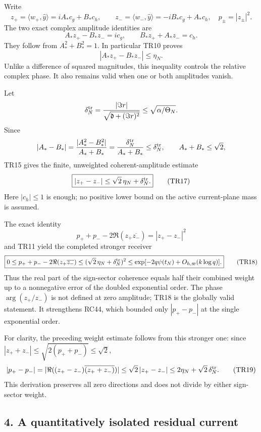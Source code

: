 \documentclass[10pt]{article}
\begin{document}
Write \[
z_+=\langle w_+,\widehat y\rangle=iA_*c_g+B_*c_h,\qquad
z_-=\langle w_-,\widehat y\rangle=-iB_*c_g+A_*c_h,
\quad p_\pm=|z_\pm|^2.
\tag{TR15}
\] The two exact complex amplitude identities are \[
\boxed{A_*z_+-B_*z_-=ic_g,\qquad
B_*z_++A_*z_-=c_h.}
\tag{TR16}
\] They follow from \(A_*^2+B_*^2=1\). In particular TR10 proves \[
|A_*z_+-B_*z_-|\le\eta_N.
\] Unlike a difference of squared magnitudes, this inequality controls the relative complex phase. It also remains valid when one or both amplitudes vanish.

Let \[
\delta_N^{\rm tr}=\frac{|\Im r|}{\sqrt{\mathfrak d+(\Im r)^2}}
\le\sqrt{\alpha/\Theta_N}.
\] Since \[
|A_*-B_*|=\frac{|A_*^2-B_*^2|}{A_*+B_*}
=\frac{\delta_N^{\rm tr}}{A_*+B_*}
\le\delta_N^{\rm tr},\qquad A_*+B_*\le\sqrt2,
\] TR15 gives the finite, unweighted coherent-amplitude estimate \[
\boxed{|z_+-z_-|\le
\sqrt2\,\eta_N+\delta_N^{\rm tr}.}
\tag{TR17}
\] Here \(|c_h|\le1\) is enough; no positive lower bound on the active current-plane mass is assumed.

The exact identity \[
p_++p_--2\Re(z_+\overline{z_-})=|z_+-z_-|^2
\] and TR11 yield the completed stronger receiver \[
\boxed{0\le p_++p_--2\Re(z_+\overline{z_-})
\le(\sqrt2\,\eta_N+\delta_N^{\rm tr})^2
\le\exp[-2q\psi(t_N)+O_{h,\varpi}(k\log q)].}
\tag{TR18}
\] Thus the real part of the sign-sector coherence equals half their combined weight up to a nonnegative error of the doubled exponential order. The phase \(\arg(z_+/z_-)\) is not defined at zero amplitude; TR18 is the globally valid statement. It strengthens RC44, which bounded only \(|p_+-p_-|\) at the single exponential order.

For clarity, the preceding weight estimate follows from this stronger one: since \(|z_++z_-|\le\sqrt{2(p_++p_-)}\le\sqrt2\), \[
|p_+-p_-|
=|\Re((z_+-z_-)\overline{(z_++z_-)})|
\le\sqrt2\,|z_+-z_-|
\le 2\eta_N+\sqrt2\,\delta_N^{\rm tr}.
\tag{TR19}
\] This derivation preserves all zero directions and does not divide by either sign-sector weight.

\subsection{4. A quantitatively isolated residual current}\label{a-quantitatively-isolated-residual-current}
\end{document}
